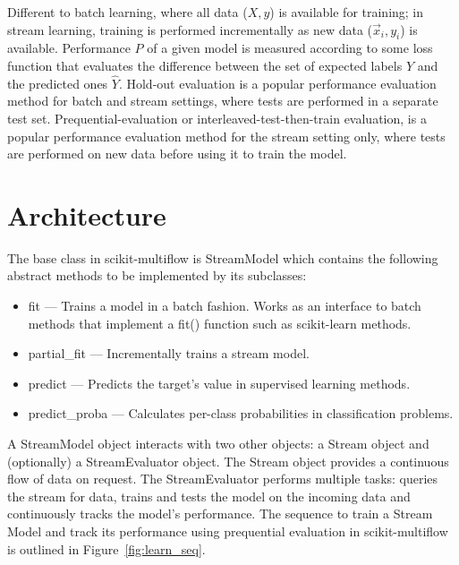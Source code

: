 \documentclass[twoside,11pt]{article}
\newcommand{\skmultiflow}{\textsf{scikit-multiflow}\xspace}
\newcommand{\sklearn}{\textsf{scikit-learn}\xspace}
\newcommand{\streammodel}{\textsf{StreamModel}\xspace}
\newcommand{\streamevaluator}{\textsf{StreamEvaluator}\xspace}
\newcommand{\stream}{\textsf{Stream}\xspace}
\newcommand{\reffig}[1]{Figure~\ref{#1}}
\begin{document}
Different to batch learning, where all data ($X, y$) is available for training; in stream learning, training is performed incrementally as new data ($\vec{x}_i, y_i$) is available. Performance $P$ of a given model is measured according to some loss function that evaluates the difference between the set of expected labels $Y$ and the predicted ones $\hat{Y}$. Hold-out evaluation is a popular performance evaluation method for batch and stream settings, where tests are performed in a separate test set. Prequential-evaluation \citep{dawid1984prequential} or interleaved-test-then-train evaluation, is a popular performance evaluation method for the stream setting only, where tests are performed on new data before using it to train the model.

\section{Architecture}\label{sec:Architecture}
The base class in \skmultiflow is \streammodel which contains the following abstract methods to be implemented by its subclasses:
\begin{itemize}[noitemsep]
\item \textsf{fit} --- Trains a model in a batch fashion. Works as an interface to batch methods that implement a \textsf{fit()} function such as \sklearn methods.
    \item \textsf{partial\_fit} --- Incrementally trains a stream model.
    \item \textsf{predict} --- Predicts the target's value in supervised learning methods.
    \item \textsf{predict\_proba} --- Calculates per-class probabilities in classification problems.
\end{itemize}

A \streammodel object interacts with two other objects: a \stream object and (optionally) a \streamevaluator object. The \stream object provides a continuous flow of data on request. The \streamevaluator performs multiple tasks: queries the stream for data, trains and tests the model on the incoming data and continuously tracks the model's performance. The sequence to train a Stream Model and track its performance using prequential evaluation in \skmultiflow is outlined in \reffig{fig:learn_seq}. 
\end{document}
